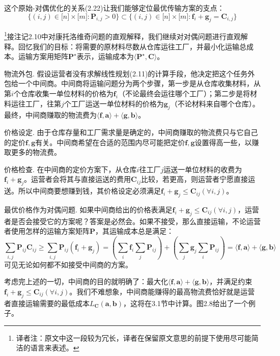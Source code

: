 \documentclass[cn,10pt,math=newtx,citestyle=gb7714-2015,bibstyle=gb7714-2015]{elegantbook}
\begin{document}
\vspace{2em}

这个原始-对偶优化的关系(2.22)让我们能够定位最优传输方案的支点：
\begin{equation}
    \label{2.23}
    \{ (i,j)\in\mathbb{[}n\mathbb{]}\times \mathbb{[}m\mathbb{]}:\mathbf{P}_{i,j}>0 \} \subset \{ (i,j)\in\mathbb{[}n\mathbb{]}\times \mathbb{[}m\mathbb{]}:\mathbf{f}_i+\mathbf{g}_j=\mathbf{C}_{i,j} \}
\end{equation}

\begin{postulate}[对偶问题的直观解释]
\footnote{译者注：原文中这一段较为冗长，译者在保留原文意思的前提下使用尽可能简洁的语言来表述。}接注记2.10中对康托洛维奇问题的直观解释，我们继续对对偶问题进行直观解释。回忆我们的目标：将需要的原材料尽数从仓库运往工厂，并最小化运输总成本。运输方案用矩阵$\mathbf{P}^\star$表示，运输成本为$\langle \mathbf{P}^\star ,\mathbf{C} \rangle$。

{\heiti 物流外包.} 假设运营者没有求解线性规划(2.11)的计算手段，他决定把这个任务外包给一个中间商。中间商将运输问题分为两个步骤，第一步是从仓库收集材料，从第$i$个仓库收集一单位材料的价格为$\mathbf{f}_i$（不论最终会运往哪个工厂）；第二步是将材料运往工厂，往第$j$个工厂运送一单位材料的价格为$\mathbf{g}_j$（不论材料来自哪个仓库）。最终，中间商赚取的物流费为$\langle \mathbf{f,a} \rangle + \langle \mathbf{g,b} \rangle$。

{\heiti 价格设定.} 由于仓库存量和工厂需求量是确定的，中间商赚取的物流费只与它自己的定价$\mathbf{f,g}$有关。中间商希望在合适的范围内尽可能把定价$\mathbf{f,g}$设置得高一些，以赚取更多的物流费。

{\heiti 价格检查.} 在中间商的定价方案下，从仓库$i$往工厂$j$运送一单位材料的收费为$\mathbf{f}_i+\mathbf{g}_j$。运营者会将其与直接运送的费用$\mathbf{C}_{ij}$比较，若更高，则运营者宁愿直接运送。所以中间商要想赚到钱，其价格设定必须满足$\mathbf{f}_i+\mathbf{g}_j\leq \mathbf{C}_{ij}(\forall i,j)$。

{\heiti 最优价格作为对偶问题.} 如果中间商给出的价格表满足$\mathbf{f}_i+\mathbf{g}_j\leq \mathbf{C}_{ij}(\forall i,j)$，运营者是否会接受它的方案呢？答案是必然会。如果不接受，那么直接运输，不论运营者使用怎样的运输方案矩阵$\mathbf{P}$，其运输成本总是满足：
\begin{equation*}
    \sum_{i,j}\mathbf{P}_{ij}\mathbf{C}_{ij} \geq \sum_{i,j}\mathbf{P}_{ij}(\mathbf{f}_i+\mathbf{g}_j)=\left( \sum_i\mathbf{f}_i\sum_j\mathbf{P}_{ij} \right)+\left( \sum_j\mathbf{g}_j\sum_i\mathbf{P}_{ij} \right)=\langle \mathbf{f,a} \rangle + \langle \mathbf{g,b} \rangle
\end{equation*}
可见无论如何都不如接受中间商的方案。

考虑完上述的一切，中间商的目的就明确了：最大化$\langle \mathbf{f,a} \rangle + \langle \mathbf{g,b} \rangle$，并满足约束$\mathbf{f}_i+\mathbf{g}_j\leq \mathbf{C}_{ij}(\forall i,j)$。我们不难想象，中间商能赚得的最高物流费恰好就是运营者直接运输需要的最低成本$L_\mathbf{C}(\mathbf{a,b})$，这将在3.1节中计算。图2.8给出了一个例子。

\end{postulate}
\end{document}
